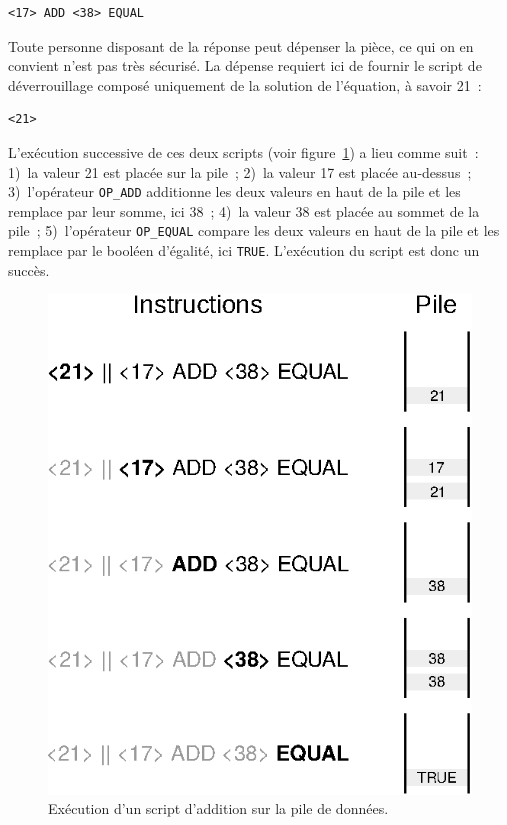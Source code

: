 \begin{Verbatim}[fontsize=\small]
<17> ADD <38> EQUAL
\end{Verbatim}

Toute personne disposant de la réponse peut dépenser la pièce, ce qui on en convient n'est pas très sécurisé. La dépense requiert ici de fournir le script de déverrouillage composé uniquement de la solution de l'équation, à savoir 21~:

\begin{Verbatim}[fontsize=\small]
<21>
\end{Verbatim}

L'exécution successive de ces deux scripts (voir figure~\ref{fig:bitcoin-stack}) a lieu comme suit~: 1)~la valeur 21 est placée sur la pile~; 2)~la valeur 17 est placée au-dessus~; 3)~l'opérateur \texttt{OP\_ADD} additionne les deux valeurs en haut de la pile et les remplace par leur somme, ici 38~; 4)~la valeur 38 est placée au sommet de la pile~; 5)~l'opérateur \texttt{OP\_EQUAL} compare les deux valeurs en haut de la pile et les remplace par le booléen d'égalité, ici \texttt{TRUE}. L'exécution du script est donc un succès.

\begin{figure}[ht]
  \centering
  \includegraphics[scale=0.75]{img/bitcoin-stack-example.eps}
  \caption{Exécution d'un script d'addition sur la pile de données.}
  \label{fig:bitcoin-stack}
\end{figure}

